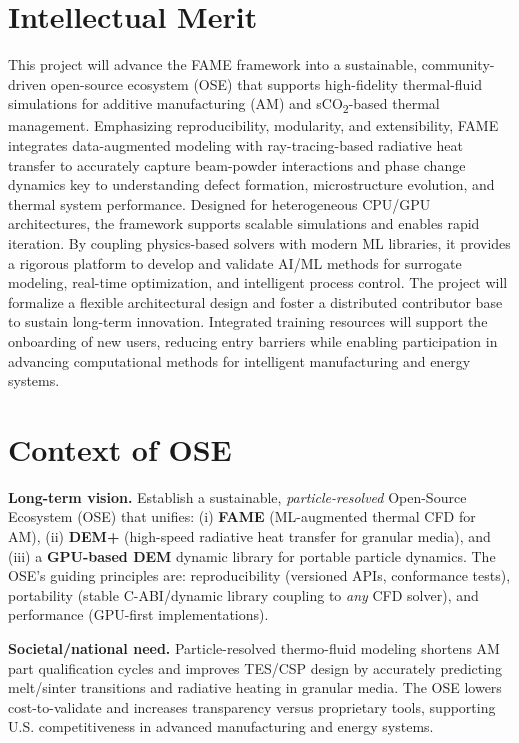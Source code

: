\documentclass[11pt]{article}
\newcommand{\CO}[1]{CO\textsubscript{#1}}
\begin{document}
\section*{Intellectual Merit}
\vspace{-3pt}
\noindent
This project will advance the FAME framework into a sustainable, community-driven open-source ecosystem (OSE) that supports high-fidelity thermal-fluid simulations for additive manufacturing (AM) and s\CO{2}-based thermal management. Emphasizing reproducibility, modularity, and extensibility, FAME integrates data-augmented modeling with ray-tracing-based radiative heat transfer to accurately capture beam-powder interactions and phase change dynamics key to understanding defect formation, microstructure evolution, and thermal system performance. Designed for heterogeneous CPU/GPU architectures, the framework supports scalable simulations and enables rapid iteration. By coupling physics-based solvers with modern ML libraries, it provides a rigorous platform to develop and validate AI/ML methods for surrogate modeling, real-time optimization, and intelligent process control. The project will formalize a flexible architectural design and foster a distributed contributor base to sustain long-term innovation. Integrated training resources will support the onboarding of new users, reducing entry barriers while enabling participation in advancing computational methods for intelligent manufacturing and energy systems.
\vspace{-3pt}

\section*{Context of OSE}
\vspace{-3pt}
\noindent
\textbf{Long-term vision.} Establish a sustainable, \textit{particle-resolved} Open-Source Ecosystem (OSE) that unifies: (i) \textbf{FAME} (ML-augmented thermal CFD for AM), (ii) \textbf{DEM+} (high-speed radiative heat transfer for granular media), and (iii) a \textbf{GPU-based DEM} dynamic library for portable particle dynamics. The OSE's guiding principles are: reproducibility (versioned APIs, conformance tests), portability (stable C-ABI/dynamic library coupling to \emph{any} CFD solver), and performance (GPU-first implementations).\vspace{4pt}

\noindent
\textbf{Societal/national need.} Particle-resolved thermo-fluid modeling shortens AM part qualification cycles and improves TES/CSP design by accurately predicting melt/sinter transitions and radiative heating in granular media. The OSE lowers cost-to-validate and increases transparency versus proprietary tools, supporting U.S. competitiveness in advanced manufacturing and energy systems.\vspace{4pt}
\end{document}
